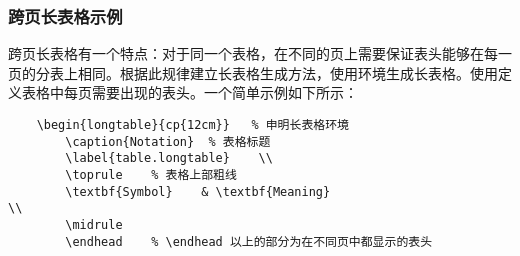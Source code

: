 \documentclass{nitthesis}
\begin{document}
\subsubsection{跨页长表格示例}

跨页长表格有一个特点：对于同一个表格，在不同的页上需要保证表头能够在每一页的分表上相同。根据此规律建立长表格生成方法，使用环境生成长表格。使用定义表格中每页需要出现的表头。一个简单示例如下所示：

\linespread{1}
\begin{lstlisting}
    \begin{longtable}{cp{12cm}}   % 申明长表格环境
        \caption{Notation}  % 表格标题
        \label{table.longtable}    \\
        \toprule    % 表格上部粗线
        \textbf{Symbol}    & \textbf{Meaning}                                                                             \\
        \midrule
        \endhead    % \endhead 以上的部分为在不同页中都显示的表头
        

\end{lstlisting}
\end{document}

